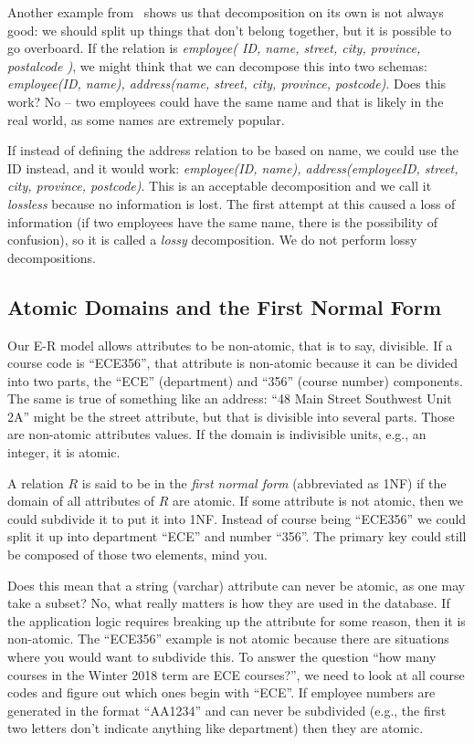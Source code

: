 \documentclass[a4paper]{report}
\begin{document}
Another example from~\cite{dsc} shows us that decomposition on its own is not always good: we should split up things that don't belong together, but it is possible to go overboard. If the relation is \textit{employee( ID, name, street, city, province, postalcode )}, we might think that we can decompose this into two schemas: \textit{employee(ID, name), address(name, street, city, province, postcode)}. Does this work? No -- two employees could have the same name and that is likely in the real world, as some names are extremely popular. 

If instead of defining the address relation to be based on name, we could use the ID instead, and it would work: \textit{employee(ID, name), address(employeeID, street, city, province, postcode)}. This is an acceptable decomposition and we call it \textit{lossless} because no information is lost. The first attempt at this caused a loss of information (if two employees have the same name, there is the possibility of confusion), so it is called a \textit{lossy} decomposition. We do not perform lossy decompositions.

\subsection*{Atomic Domains and the First Normal Form}

Our E-R model allows attributes to be non-atomic, that is to say, divisible. If a course code is ``ECE356'', that attribute is non-atomic because it can be divided into two parts, the ``ECE'' (department) and ``356'' (course number) components. The same is true of something like an address: ``48 Main Street Southwest Unit 2A'' might be the street attribute, but that is divisible into several parts. Those are non-atomic attributes values. If the domain is indivisible units, e.g., an integer, it is atomic.

A relation $R$ is said to be in the \textit{first normal form} (abbreviated as 1NF) if the domain of all attributes of $R$ are atomic. If some attribute is not atomic, then we could subdivide it to put it into 1NF. Instead of course being ``ECE356'' we could split  it up into department ``ECE'' and number ``356''. The primary key could still be composed of those two elements, mind you.

Does this mean that a string (varchar) attribute can never be atomic, as one may take a subset? No, what really matters is how they are used in the database. If the application logic requires breaking up the attribute for some reason, then it is non-atomic. The ``ECE356'' example is not atomic because there are situations where you would want to subdivide this. To answer the question ``how many courses in the Winter 2018 term are ECE courses?'', we need to look at all course codes and figure out which ones begin with ``ECE''. If employee numbers are generated in the format ``AA1234'' and can never be subdivided (e.g., the first two letters don't indicate anything like department) then they are atomic. 
\end{document}

